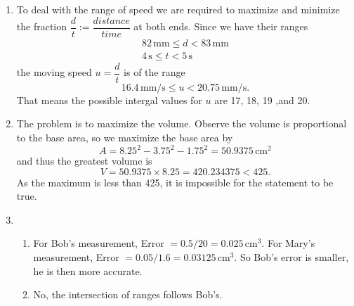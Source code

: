 \documentclass[12pt]{article}
\begin{document}
\begin{enumerate}
        \item To deal with the range of speed we are required to maximize and minimize the fraction $\dfrac{d}{t}:=\dfrac{distance}{time}$ at both ends. Since we have their ranges \begin{align}
            82 \,\mathrm{mm} \leq d < 83\,\mathrm{mm}\\
            4\, \mathrm{s} \leq t < 5\, \mathrm{s}
        \end{align} the moving speed $u=\dfrac{d}{t}$ is of the range \[16.4 \,\mathrm{mm/s}\leq u < 20.75\,\mathrm{mm/s}.\] That means the possible intergal values for $u$ are 17, 18, 19 ,and 20.
        \item The problem is to maximize the volume. Observe the volume is proportional to the base area, so we maximize the base area by \[A = 8.25^2 - 3.75^2 - 1.75^2 = 50.9375 \,\mathrm{cm}^2\] and thus the greatest volume is \[V = 50.9375 \times 8.25 = 420.234375 < 425.\] As the maximum is less than 425, it is impossible for the statement to be true.
        \item \begin{enumerate}
            \item For Bob's measurement, Error $= 0.5/20 = 0.025 \,\mathrm{cm}^3$. For Mary's measurement, Error $= 0.05/1.6 = 0.03125\,\mathrm{cm}^3$. So Bob's error is smaller, he is then more accurate.
            \item No, the intersection of ranges follows Bob's.
        \end{enumerate}
    \end{enumerate}

    \newpage
\end{document}
